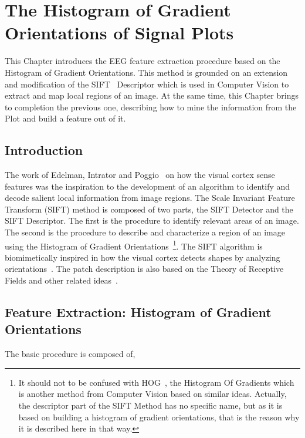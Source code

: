 \chapter{The Histogram of Gradient Orientations of Signal Plots}
\label{chapter:three}

This Chapter introduces the EEG feature extraction procedure based on the Histogram of Gradient Orientations.  This method is grounded on an extension and modification of the SIFT~\cite{Lowe2004} Descriptor which is used in Computer Vision to extract and map local regions of an image.  At the same time, this Chapter brings to completion the previous one, describing how to mine the information from the Plot and build a feature out of it.

\section{Introduction}


The work of Edelman, Intrator and Poggio~\cite{Edelman1997} on how the visual cortex sense features was the inspiration to the development of an algorithm to identify and decode salient local information from image regions.  The Scale Invariant Feature Transform (SIFT) method is composed of two parts, the SIFT Detector and the SIFT Descriptor.  The first is the procedure to identify relevant areas of an image.  The second is the procedure to describe and characterize a region of an image using the Histogram of Gradient Orientations~\footnote{It should not to be confused with HOG~\cite{Dalal2005}, the Histogram Of Gradients which is another method from Computer Vision based on similar ideas.  Actually, the descriptor part of the SIFT Method has no specific name, but as it is based on building a histogram of gradient orientations, that is the reason why it is described here in that way. }.  The SIFT algorithm is biomimetically inspired in how the visual cortex detects shapes by analyzing orientations~\cite{Edelman1997}.  The patch description is also based on the Theory of Receptive Fields and other related ideas~\cite{Lindeberg2013}.

\section{Feature Extraction: Histogram of Gradient Orientations}
\label{SIFT}

The basic procedure is composed of,

